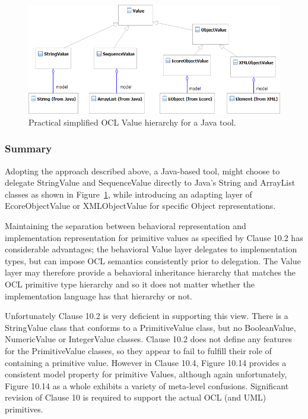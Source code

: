 \documentclass{eceasst}
\begin{document}
\begin{figure}
  \begin{center}
    \includegraphics[width=5.75in]{Value.png}
  \end{center}
  \caption{Practical simplified OCL Value hierarchy for a Java tool.}
  \label{fig:Value}
\end{figure}

\subsubsection{Summary}

Adopting the approach described above, a Java-based tool, might choose to delegate StringValue and SequenceValue directly to Java's String and ArrayList classes as shown in Figure~\ref{fig:Value}, while introducing an adapting layer of EcoreObjectValue or XMLObjectValue for specific Object representations.

Maintaining the separation between behavioral representation and implementation representation for primitive values as specified by Clause 10.2 has considerable advantages; the behavioral Value layer delegates to implementation types, but can impose OCL semantics consistently prior to delegation. The Value layer may therefore provide a behavioral inheritance hierarchy that matches the OCL primitive type hierarchy and so it does not matter whether the implementation language has that hierarchy or not.

Unfortunately Clause 10.2 is very deficient in supporting this view. There is a StringValue class that conforms to a PrimitiveValue class, but no BooleanValue, NumericValue or IntegerValue classes. Clause 10.2  does not define any features for the PrimitiveValue classes, so they appear to fail to fulfill their role of containing a primitive value. However in Clause 10.4, Figure 10.14 provides a consistent model property for primitive Values, although again unfortunately, Figure 10.14 as a whole exhibits a variety of meta-level confusions. Significant revision of Clause 10 is required to support the actual OCL (and UML) primitives.
\end{document}
